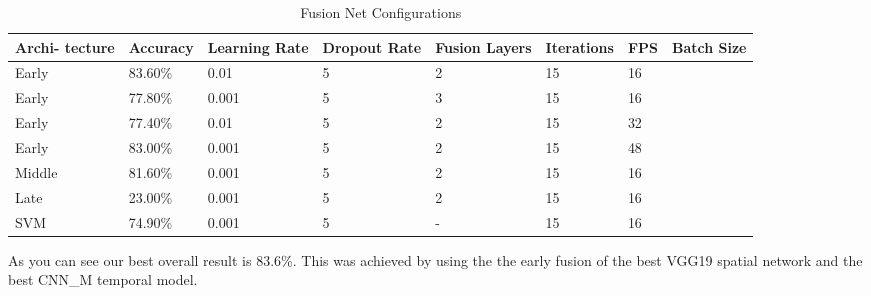 \begin{table}[H]
\centering
\caption{Fusion Net Configurations}
\label{table:fusion_results}
\begin{tabularx}{\textwidth}{XXXXXXXX}
\toprule
Archi- tecture 		&  Accuracy	& Learning Rate 	& Dropout Rate	& Fusion Layers & Iterations	& FPS & Batch Size \\ \midrule
Early  & 83.60\%  & 0.01  & 5 & 2 & 15 & 16 \\
Early  & 77.80\%  & 0.001 & 5 & 3 & 15 & 16 \\
Early  & 77.40\%  & 0.01  & 5 & 2 & 15 & 32 \\
Early  & 83.00\%  & 0.001 & 5 & 2 & 15 & 48 \\
Middle & 81.60\%  & 0.001 & 5 & 2 & 15 & 16 \\
Late   & 23.00\%  & 0.001 & 5 & 2 & 15 & 16 \\
SVM    & 74.90\%  & 0.001 & 5 & - & 15 & 16 \\
\bottomrule
\end{tabularx}
\end{table}

As you can see our best overall result is 83.6\%.
This was achieved by using the the early fusion of the best VGG19 spatial network and the best CNN\_M temporal model.